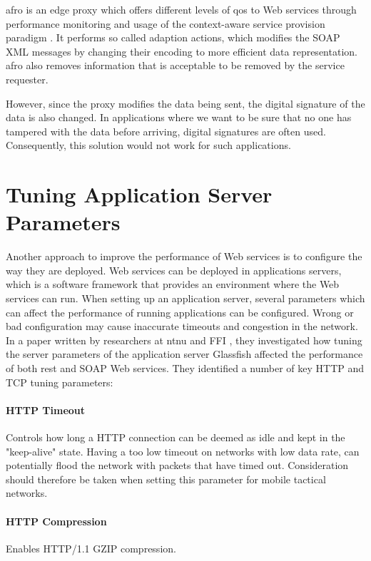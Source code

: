 \gls{afro} is an edge proxy which offers different levels of \gls{qos} to Web
services through performance monitoring and usage of the context-aware
service provision paradigm \cite{ist-090}. It performs so called adaption actions, which
modifies the SOAP XML messages by changing their encoding to more efficient data
representation. \gls{afro} also removes information that is acceptable to be removed by
the service requester.

However, since the proxy modifies the data being sent, the digital signature of
the data is also changed. In applications where we want to be sure that no one
has tampered with the data before arriving, digital signatures are often used.
Consequently, this solution would not work for such applications.


\section{Tuning Application Server Parameters}

 Another approach to improve the performance of Web services is to configure
 the way they are deployed. Web services can be deployed in applications
 servers, which is a software framework that provides an environment where the
 Web services can run. When setting up an application server, several parameters
 which can affect the performance of running applications can be
 configured. Wrong or bad configuration may cause inaccurate timeouts and
 congestion in the network. In a paper written by researchers at \gls{ntnu} and
 FFI \cite{johnsen-recommendations}, they
 investigated how tuning the server parameters of the application server
 Glassfish affected the performance of both \gls{rest} and SOAP Web services.
 They identified a number of key HTTP and TCP tuning parameters:

\paragraph{HTTP Timeout} Controls how long a HTTP connection can be deemed as
idle and kept in the "keep-alive" state. Having a too low timeout on networks
with low data rate, can potentially flood the network with packets that have
timed out. Consideration should therefore be taken when setting this
parameter for mobile tactical networks.

\paragraph{HTTP Compression} Enables HTTP/1.1 GZIP compression.

